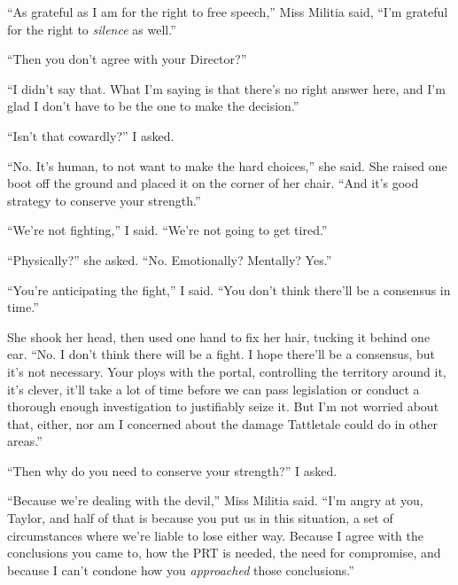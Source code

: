 ``As grateful as I am for the right to free speech,'' Miss Militia said, ``I'm grateful for the right to \emph{silence} as well.''



``Then you don't agree with your Director?''



``I didn't say that.  What I'm saying is that there's no right answer here, and I'm glad I don't have to be the one to make the decision.''



``Isn't that cowardly?''  I asked.



``No.  It's human, to not want to make the hard choices,'' she said.  She raised one boot off the ground and placed it on the corner of her chair.  ``And it's good strategy to conserve your strength.''



``We're not fighting,'' I said.  ``We're not going to get tired.''



``Physically?'' she asked.  ``No.  Emotionally?  Mentally? Yes.''



``You're anticipating the fight,'' I said.  ``You don't think there'll be a consensus in time.''



She shook her head, then used one hand to fix her hair, tucking it behind one ear.  ``No.  I don't think there will be a fight.  I hope there'll be a consensus, but it's not necessary.  Your ploys with the portal, controlling the territory around it, it's clever, it'll take a lot of time before we can pass legislation or conduct a thorough enough investigation to justifiably seize it.  But I'm not worried about that, either, nor am I concerned about the damage Tattletale could do in other areas.''



``Then why do you need to conserve your strength?'' I asked.



``Because we're dealing with the devil,'' Miss Militia said.  ``I'm angry at you, Taylor, and half of that is because you put us in this situation, a set of circumstances where we're liable to lose either way.  Because I agree with the conclusions you came to, how the PRT is needed, the need for compromise, and because I can't condone how you \emph{approached} those conclusions.''



